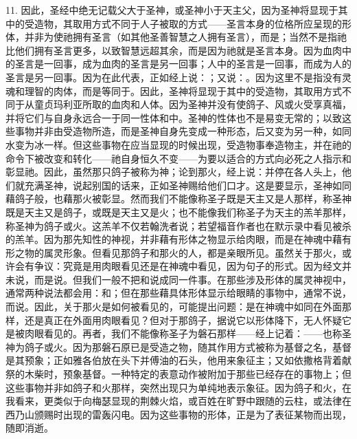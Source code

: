 11. 因此，圣经中绝无记载父大于圣神，或圣神小于天主父，因为圣神将显现于其中的受造物，其取用方式不同于人子被取的方式——圣言本身的位格所应呈现的形体，并非为使祂拥有圣言（如其他圣善智慧之人拥有圣言），而是；当然不是指祂比他们拥有圣言更多，以致智慧远超其余，而是因为祂就是圣言本身。因为血肉中的圣言是一回事，成为血肉的圣言是另一回事；人中的圣言是一回事，而成为人的圣言是另一回事。因为在此代表，正如经上说：；又说：。因为这里不是指没有灵魂和理智的肉体，而是等同于。因此，圣神将显现于其中的受造物，其取用方式不同于从童贞玛利亚所取的血肉和人体。因为圣神并没有使鸽子、风或火受享真福，并将它们与自身永远合一于同一性体和中。圣神的性体也不是易变无常的；以致这些事物并非由受造物所造，而是圣神自身先变成一种形态，后又变为另一种，如同水变为冰一样。但这些事物在应当显现的时候出现，受造物事奉造物主，并在祂的命令下被改变和转化——祂自身恒久不变——为要以适合的方式向必死之人指示和彰显祂。因此，虽然那只鸽子被称为神；论到那火，经上说：并停在各人头上，他们就充满圣神，说起别国的话来，正如圣神赐给他们口才。这是要显示，圣神如同藉鸽子般，也藉那火被彰显。然而我们不能像称圣子既是天主又是人那样，称圣神既是天主又是鸽子，或既是天主又是火；也不能像我们称圣子为天主的羔羊那样，称圣神为鸽子或火。这羔羊不仅若翰洗者说；若望福音作者也在默示录中看见被杀的羔羊。因为那先知性的神视，并非藉有形体之物显示给肉眼，而是在神魂中藉有形之物的属灵形象。但看见那鸽子和那火的人，都是亲眼所见。虽然关于那火，或许会有争议：究竟是用肉眼看见还是在神魂中看见，因为句子的形式。因为经文并未说，而是说。但我们一般不把和说成同一件事。在那些涉及形体的属灵神视中，通常两种说法都会用：和；但在那些藉具体形体显示给眼睛的事物中，通常不说，而说。因此，关于那火是如何被看见的，可能提出问题：是在神魂中如同在外面那样，还是真正在外面用肉眼看见？但对于那鸽子，据说它以形体降下，无人怀疑它是被肉眼看见的。再者，我们不能像称圣子为磐石那样——经上记着：——也称圣神为鸽子或火。因为那磐石原已是受造之物，随其作用方式被称为基督之名，基督是其预象；正如雅各伯放在头下并傅油的石头，他用来象征主；又如依撒格背着献祭的木柴时，预象基督。一种特定的表意动作被附加于那些已经存在的事物上；但这些事物并非如鸽子和火那样，突然出现只为单纯地表示象征。因为鸽子和火，在我看来，更类似于向梅瑟显现的荆棘火焰，或百姓在旷野中跟随的云柱，或法律在西乃山颁赐时出现的雷轰闪电。因为这些事物的形体，正是为了表征某物而出现，随即消逝。\par

